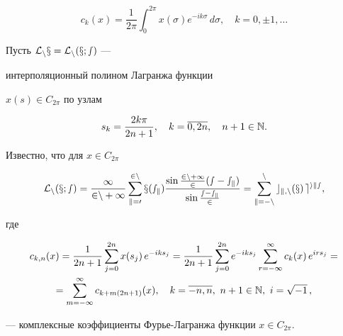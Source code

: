 $$


c_k(x)=\frac{1}{2\pi}\int_0^{2\pi}x(\sigma )e^{-ik\sigma }\, d\sigma ,\quad


k=0, \pm 1, \dotsc


$$





Пусть $\cal L_nx =\cal L_n(x;s)$ ---


интерполяционный полином Лагранжа функции


$x(s)\in C_{2\pi }$ по узлам


\begin{equation}


s_k=\frac{2k\pi }{2n+1}, \quad k=\overline{0,2n},\quad n+1\in \Bbb{N}.


\end{equation}





Известно, что для $x\in C_{2\pi}$


\begin{equation}


\cal L_n(x;s)=\frac{1}{2n+1}\sum_{k=0}^{2n}x(s_k)




\frac{\sin \frac{2n+1}{2}(s-s_k)}


{\sin\frac{s-s_k}{2}}




=\sum_{k=-n}^nc_{k,n}(x)\, e^{iks},


\end{equation}


где


\begin{multline}


c_{k,n}(x)=\frac{1}{2n+1}\sum_{j=0}^{2n}x(s_j)\, e^{-iks_j} = \frac{1}{2n+1}


\sum_{j=0}^{2n}e^{-iks_j}\sum_{r=-\infty }^\infty c_k(x)\, e^{irs_j}=\\


%


=\sum_{m=-\infty }^\infty c_{k+m(2n+1)}(x),\quad


k=\overline{-n,n},\ n+1\in \Bbb{N},\ i=\sqrt{-1}\, ,


\end{multline}


--- комплексные коэффициенты Фурье-Лагранжа функции $x\in C_{2\pi}$.





